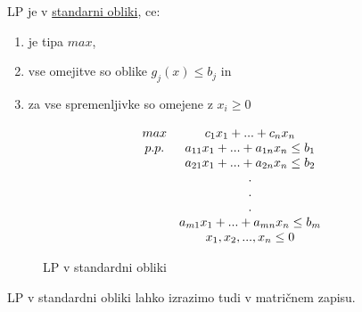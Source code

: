 \documentclass[11pt, a4paper]{article}
\begin{document}
    \begin{definition}
        LP je v \underline{standarni obliki}, ce:
        \begin{enumerate}
            \item je tipa \(max\),
            \item vse omejitve so oblike \(g_j(x) \le b_j\) in
            \item za vse spremenljivke so omejene z \(x_i \ge 0\)
        \end{enumerate}
    \end{definition}

    \begin{figure}[h!]
        \[
            \begin{array}{ c c }
                max & c_1x_1+...+c_nx_n \\
                p.p. & a_{11}x_1+...+a_{1n}x_n \le b_1 \\
                & a_{21}x_1+...+a_{2n}x_n \le b_2 \\
                & . \\
                & . \\
                & . \\
                & a_{m1}x_1+...+a_{mn}x_n \le b_m \\
                & x_1,x_2,...,x_n \le 0 \\
                
            \end{array}
        \]
        \caption{LP v standardni obliki}
    \end{figure}

    \par
    LP v standardni obliki lahko izrazimo tudi v matričnem zapisu.  
    
\end{document}

